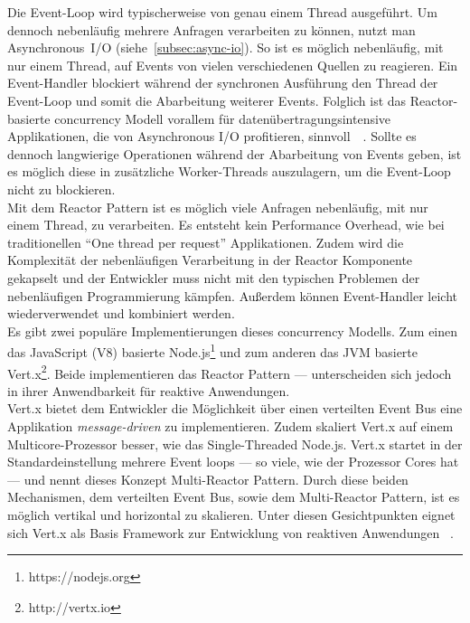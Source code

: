 Die Event-Loop wird typischerweise von genau einem Thread ausgeführt. Um dennoch nebenläufig mehrere Anfragen verarbeiten zu können, nutzt man Asynchronous~I/O (siehe~\ref{subsec:async-io}). So ist es möglich nebenläufig, mit nur einem Thread, auf Events von vielen verschiedenen Quellen zu reagieren. Ein Event-Handler blockiert während der synchronen Ausführung den Thread der Event-Loop und somit die Abarbeitung weiterer Events. Folglich ist das Reactor-basierte \gls{concurrency} Modell vorallem für datenübertragungsintensive Applikationen, die von Asynchronous I/O profitieren, sinnvoll~\cite[S.~73]{kuhn_reactive_2015}~\cite[S.~92]{erb_concurrent_2012}. Sollte es dennoch langwierige Operationen während der Abarbeitung von Events geben, ist es möglich diese in zusätzliche Worker-Threads auszulagern, um die Event-Loop nicht zu blockieren.\\
Mit dem Reactor Pattern ist es möglich viele Anfragen nebenläufig, mit nur einem Thread, zu verarbeiten. Es entsteht kein Performance Overhead, wie bei traditionellen \enquote{One thread per request} Applikationen. Zudem wird die Komplexität der nebenläufigen Verarbeitung in der Reactor Komponente gekapselt und der Entwickler muss nicht mit den typischen Problemen der nebenläufigen Programmierung kämpfen. Außerdem können Event-Handler leicht wiederverwendet und kombiniert werden.\\
Es gibt zwei populäre Implementierungen dieses \gls{concurrency} Modells. Zum einen das JavaScript (V8) basierte Node.js\footnote{https://nodejs.org} und zum anderen das JVM basierte Vert.x\footnote{http://vertx.io}. Beide implementieren das Reactor Pattern --- unterscheiden sich jedoch in ihrer Anwendbarkeit für reaktive Anwendungen.\\
Vert.x bietet dem Entwickler die Möglichkeit über einen verteilten Event Bus eine Applikation \textit{message-driven} zu implementieren. Zudem skaliert Vert.x auf einem Multicore-Prozessor besser, wie das Single-Threaded Node.js. Vert.x startet in der Standardeinstellung mehrere Event loops --- so viele, wie der Prozessor Cores hat --- und nennt dieses Konzept Multi-Reactor Pattern. Durch diese beiden Mechanismen, dem verteilten Event Bus, sowie dem Multi-Reactor Pattern, ist es möglich vertikal und horizontal zu skalieren. Unter diesen Gesichtpunkten eignet sich Vert.x als Basis Framework zur Entwicklung von reaktiven Anwendungen~\cite[S.~74]{kuhn_reactive_2015} \cite[S.~93~\&~S.~94]{erb_concurrent_2012}.

\pagebreak

